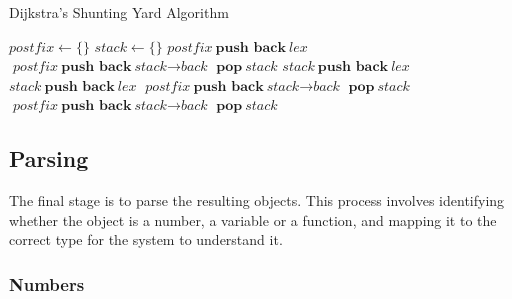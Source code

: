\documentclass[12pt]{article}
\begin{document}
\begin{algorithm}
\caption{Dijkstra's Shunting Yard Algorithm}\label{shuntingalgorithm}
\begin{algorithmic}[1]
	\State $\textit{postfix} \gets \{\}$
	\State $\textit{stack} \gets \{\}$
		 
			\State $\textit{postfix} \ \textbf{push back} \ \textit{lex}$
				\State $\textit{postfix} \ \textbf{push back} \ \textit{stack} \rightarrow \textit{back}$
				\State $\textbf{pop} \ \textit{stack}$
			\EndWhile
			\State $\textit{stack} \ \textbf{push back} \ \textit{lex}$
			\State $\textit{stack} \ \textbf{push back} \ \textit{lex}$ 
				\State $\textit{postfix} \ \textbf{push back} \ \textit{stack} \rightarrow \textit{back}$
			\EndWhile
			\State $\textbf{pop} \ \textit{stack}$ 
		\EndIf
	\EndFor\
	 
		\State $\textit{postfix} \ \textbf{push back} \ \textit{stack} \rightarrow \textit{back}$
		\State $\textbf{pop} \ \textit{stack}$
	\EndWhile
\EndFunction
\end{algorithmic}
\end{algorithm}

\pagebreak

\subsection{Parsing}

The final stage is to parse the resulting objects. This process involves identifying whether the object is a number, a variable or a function, and mapping it to the correct type for the system to understand it.

\subsubsection{Numbers}
\end{document}
